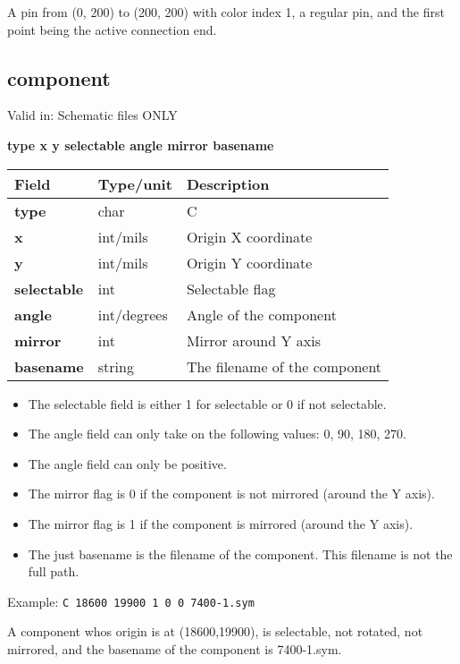 \documentclass{article}
\begin{document}
A pin from (0, 200) to (200, 200) with color index 1, a regular pin, and the
first point being the active connection end.


\subsection{component}

Valid in: Schematic files ONLY

{\bf type x y selectable angle mirror basename}

\begin{table}[h]
\begin{tabular}{|l|l|l|} \hline
Field 		& Type/unit 	& Description \\ \hline 
\hline
{\bf type} 	& char 		& C \\ \hline
{\bf x} 	& int/mils	& Origin X coordinate \\ \hline
{\bf y} 	& int/mils	& Origin Y coordinate \\ \hline
{\bf selectable}& int		& Selectable flag \\ \hline
{\bf angle} 	& int/degrees	& Angle of the component \\ \hline
{\bf mirror} 	& int 		& Mirror around Y axis \\ \hline
{\bf basename}  & string	& The filename of the component \\ \hline
\end{tabular}
\end{table}

\begin{itemize}
\item The selectable field is either 1 for selectable or 0 if not selectable.
\item The angle field can only take on the following values: 0, 90, 180, 270.
\item The angle field can only be positive.
\item The mirror flag is 0 if the component is not mirrored (around the Y axis).
\item The mirror flag is 1 if the component is mirrored (around the Y axis).
\item The just basename is the filename of the component.  This filename is 
      not the full path. 
\end{itemize}

Example:\newline
{\tt C 18600 19900 1 0 0 7400-1.sym}

A component whos origin is at (18600,19900), is selectable, not rotated, not
mirrored, and the basename of the component is 7400-1.sym.
\end{document}
